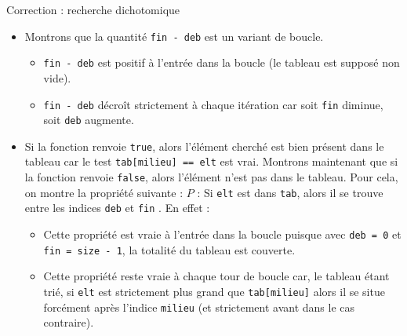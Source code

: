\documentclass[10pt]{beamer}
\begin{document}
\begin{frame}[fragile]{\Ctitle}{\stitle}
	\begin{exampleblock}{Correction : recherche dichotomique}
		\begin{itemize}
			\item<2->\textcolor{OliveGreen}{Montrons que la quantité {\tt fin - deb} est un variant de boucle.
				\begin{itemize}
					\item\textcolor{OliveGreen}{{\tt fin - deb} est positif à l'entrée dans la boucle (le tableau est supposé non vide).}
					\item\textcolor{OliveGreen}{{\tt fin - deb} décroît strictement à chaque itération car soit {\tt fin} diminue, soit {\tt deb} augmente.}
				\end{itemize}
			}
			\item<3->\textcolor{OliveGreen}{Si la fonction renvoie {\tt true}, alors l'élément cherché est bien présent dans le tableau car le test {\tt tab[milieu] == elt} est vrai. Montrons maintenant que si la fonction renvoie {\tt false}, alors l'élément n'est pas dans le tableau. Pour cela, on montre la propriété suivante : $P$ : \og{} Si {\tt elt} est dans {\tt tab}, alors il se trouve entre les indices {\tt deb} et {\tt fin} \fg{}. En effet :
				\begin{itemize}
					\item<4->\textcolor{OliveGreen}{Cette propriété est vraie à l'entrée dans la boucle puisque avec {\tt deb = 0} et {\tt fin = size - 1}, la totalité du tableau est couverte.}
					\item<5->\textcolor{OliveGreen}{Cette propriété reste vraie à chaque tour de boucle car, le tableau étant trié, si {\tt elt} est strictement plus grand que {\tt tab[milieu]} alors il se situe forcément après l'indice {\tt milieu} (et strictement avant dans le cas contraire).}
				\end{itemize}}
		\end{itemize}
	\end{exampleblock}
\end{frame}
\end{document}
